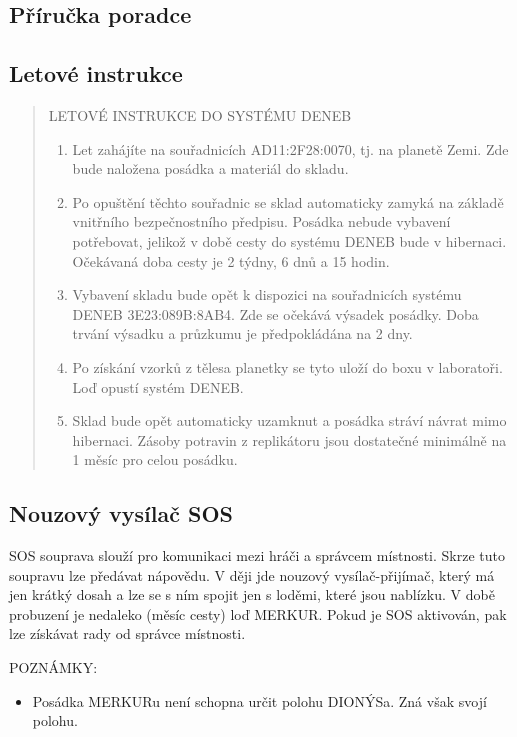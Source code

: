 \documentclass[11pt,oneside,a4paper]{article}
\begin{document}
\subsection{\texorpdfstring{Příručka poradce}{Prirucka poradce}}
\label{subsec:prirucka_poradce}

\subsection{\texorpdfstring{Letové instrukce}{Letove instrukce}}
\label{subsec:letove_instrukce}

\begin{quote}
LETOVÉ INSTRUKCE DO SYSTÉMU DENEB
\begin{enumerate}
\item Let zahájíte na souřadnicích AD11:2F28:0070, tj. na planetě Zemi. Zde bude naložena posádka a materiál do skladu.
\item Po opuštění těchto souřadnic se sklad automaticky zamyká na základě vnitřního bezpečnostního předpisu. Posádka nebude vybavení potřebovat, jelikož v době cesty do systému DENEB bude v hibernaci. Očekávaná doba cesty je 2 týdny, 6 dnů a 15 hodin.
\item Vybavení skladu bude opět k dispozici na souřadnicích systému DENEB 3E23:089B:8AB4. Zde se očekává výsadek posádky. Doba trvání výsadku a průzkumu je předpokládána na 2 dny.
\item Po získání vzorků z tělesa planetky se tyto uloží do boxu v laboratoři. Loď opustí systém DENEB.
\item Sklad bude opět automaticky uzamknut a posádka stráví návrat mimo hibernaci. Zásoby potravin z replikátoru jsou dostatečné minimálně na 1 měsíc pro celou posádku.
\end{enumerate}
\end{quote}

\subsection{\texorpdfstring{Nouzový vysílač SOS}{Nouzovy vysilac SOS}}
\label{sec:SOS}
SOS souprava slouží pro komunikaci mezi hráči a správcem místnosti. Skrze tuto soupravu lze předávat nápovědu. V ději jde nouzový vysílač-přijímač, který má jen krátký dosah a lze se s ním spojit jen s loděmi, které jsou nablízku. V době probuzení je nedaleko (měsíc cesty) loď MERKUR. Pokud je SOS aktivován, pak lze získávat rady od správce místnosti.

POZNÁMKY:
\begin{itemize}
\item Posádka MERKURu není schopna určit polohu DIONÝSa. Zná však svojí polohu.
\end{itemize}
\end{document}
